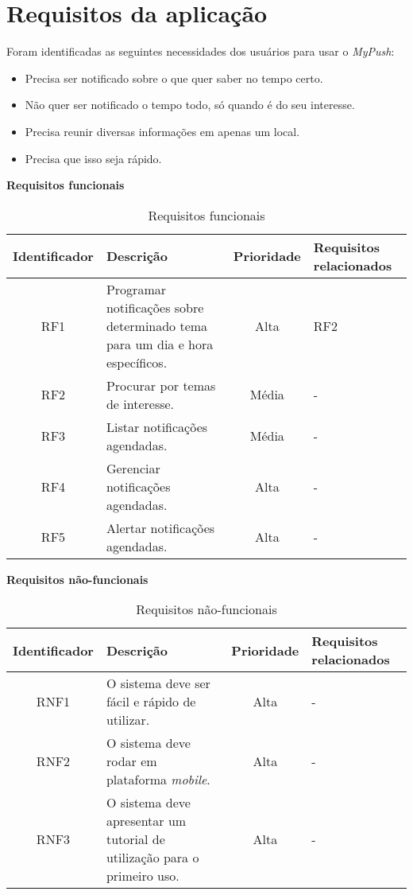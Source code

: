 \chapter{Requisitos da aplicação}

Foram identificadas as seguintes necessidades dos usuários para usar o \textit{MyPush}:

\begin{itemize}
 \item Precisa ser notificado sobre o que quer saber no tempo certo.
 \item Não quer ser notificado o tempo todo, só quando é do seu interesse.
 \item Precisa reunir diversas informações em apenas um local.
 \item Precisa que isso seja rápido.
\end{itemize}

\textbf{Requisitos funcionais}

\begin{table}[h]
\centering
  \begin{tabular}{|c|m{6cm}|c|m{2.6cm}|}

  \hline
  \textbf{Identificador} & \textbf{Descrição} & \textbf{Prioridade} & \textbf{Requisitos relacionados}\\
  \hline                               
  RF1 & Programar notificações sobre determinado tema para um dia e hora específicos. & Alta & RF2\\
  \hline
  RF2 & Procurar por temas de interesse. & Média & -\\
  \hline
  RF3 & Listar notificações agendadas. & Média & -\\
  \hline
  RF4 & Gerenciar notificações agendadas. & Alta & -\\
  \hline
  RF5 & Alertar notificações agendadas. & Alta & -\\
  \hline
  \end{tabular}
  \caption[Requisitos funcionais]{Requisitos funcionais}
\end{table}

\textbf{Requisitos não-funcionais}

\begin{table}[h]
  \centering
  \begin{tabular}{|c|m{6cm}|c|m{2.6cm}|}

  \hline
  \textbf{Identificador} & \textbf{Descrição} & \textbf{Prioridade} & \textbf{Requisitos relacionados}\\
  \hline                               
  RNF1 & O sistema deve ser fácil e rápido de utilizar. & Alta & -\\
  \hline
  RNF2 & O sistema deve rodar em plataforma \textit{mobile}. & Alta & -\\
  \hline
  RNF3 & O sistema deve apresentar um tutorial de utilização para o primeiro uso. & Alta & -\\
  \hline
  \end{tabular}
  \caption[Requisitos não-funcionais]{Requisitos não-funcionais}
\end{table}